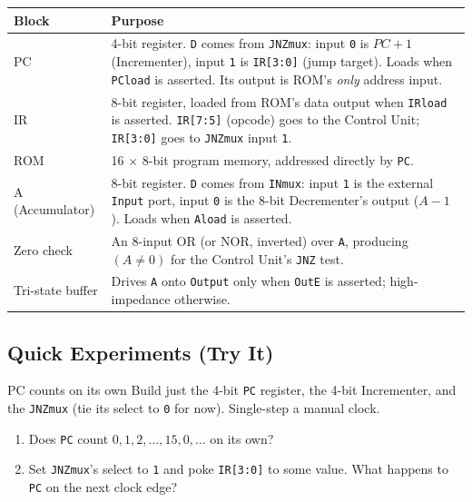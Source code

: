 \documentclass[11pt]{article}
\begin{document}
\begin{center}
\begin{tabular}{@{}p{2.9cm}p{9.5cm}@{}}
\toprule
\textbf{Block} & \textbf{Purpose} \\
\midrule
PC & 4-bit register. \texttt{D} comes from \texttt{JNZmux}: input \texttt{0} is
$PC+1$ (Incrementer), input \texttt{1} is \texttt{IR[3:0]} (jump target). Loads
when \texttt{PCload} is asserted. Its output is ROM's \emph{only} address input. \\
IR & 8-bit register, loaded from ROM's data output when \texttt{IRload} is
asserted. \texttt{IR[7:5]} (opcode) goes to the Control Unit; \texttt{IR[3:0]}
goes to \texttt{JNZmux} input \texttt{1}. \\
ROM & 16 $\times$ 8-bit program memory, addressed directly by \texttt{PC}. \\
A (Accumulator) & 8-bit register. \texttt{D} comes from \texttt{INmux}: input
\texttt{1} is the external \texttt{Input} port, input \texttt{0} is the 8-bit
Decrementer's output ($A-1$). Loads when \texttt{Aload} is asserted. \\
Zero check & An 8-input OR (or NOR, inverted) over \texttt{A}, producing
$(A \neq 0)$ for the Control Unit's \texttt{JNZ} test. \\
Tri-state buffer & Drives \texttt{A} onto \texttt{Output} only when \texttt{OutE}
is asserted; high-impedance otherwise. \\
\bottomrule
\end{tabular}
\end{center}

\subsection*{Quick Experiments (Try It)}

\begin{tryit}{PC counts on its own}
Build just the 4-bit \texttt{PC} register, the 4-bit Incrementer, and the
\texttt{JNZmux} (tie its select to \texttt{0} for now). Single-step a manual clock.
\begin{enumerate}[nosep,leftmargin=*]
  \item Does \texttt{PC} count $0,1,2,\ldots,15,0,\ldots$ on its own?
  \item Set \texttt{JNZmux}'s select to \texttt{1} and poke \texttt{IR[3:0]} to some
        value. What happens to \texttt{PC} on the next clock edge?
\end{enumerate}
\end{tryit}
\end{document}

